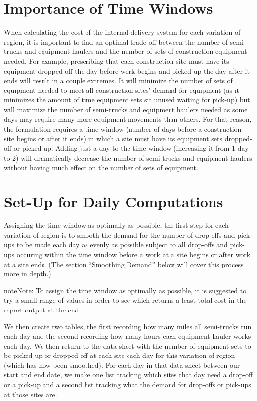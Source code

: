 \documentclass[letterpaper,10pt,english]{sphinxmanual}
\begin{document}
\section{Importance of Time Windows}
\label{\detokenize{variation:importance-of-time-windows}}
When calculating the cost of the internal delivery system for each variation
of region, it is important to find an optimal trade-off between the number of
semi-trucks and equipment haulers and the number of sets of construction
equipment needed. For example, prescribing that each construction site must
have its equipment dropped-off the day before work begins and picked-up the
day after it ends will result in a couple extremes. It will minimize the
number of sets of equipment needed to meet all construction sites' demand for
equipment (as it minimizes the amount of time equipment sets sit unused
waiting for pick-up) but will maximize the number of semi-trucks and
equipment haulers needed as some days may require many more equipment
movements than others. For that reason, the formulation requires a time
window (number of days before a construction site begins or after it ends) in
which a site must have its equipment sets dropped-off or picked-up. Adding
just a day to the time window (increasing it from 1 day to 2) will
dramatically decrease the number of semi-trucks and equipment haulers without
having much effect on the number of sets of equipment.


\section{Set-Up for Daily Computations}
\label{\detokenize{variation:set-up-for-daily-computations}}
Assigning the time window as optimally as possible, the first step for each
variation of region is to smooth the demand for the number of drop-offs and
pick-ups to be made each day as evenly as possible subject to all drop-offs
and pick-ups occuring within the time window before a work at a site begins
or after work at a site ends. (The section ``Smoothing Demand'' below will
cover this process more in depth.)

\begin{sphinxadmonition}{note}{Note:}
To assign the time window as optimally as possible, it is suggested to
try a small range of values in order to see which returns a least total
cost in the report output at the end.
\end{sphinxadmonition}

We then create two tables, the
first recording how many miles all semi-trucks run each day and the second
recording how many hours each equipment hauler works each day. We then return
to the data sheet with the number of equipment sets to be picked-up or
dropped-off at each site each day for this variation of region (which has now
been smoothed). For each day in that data sheet between our start and end
date, we make one list tracking which sites that day need a drop-off or a
pick-up and a second list tracking what the demand for drop-offs or pick-ups
at those sites are.
\end{document}
